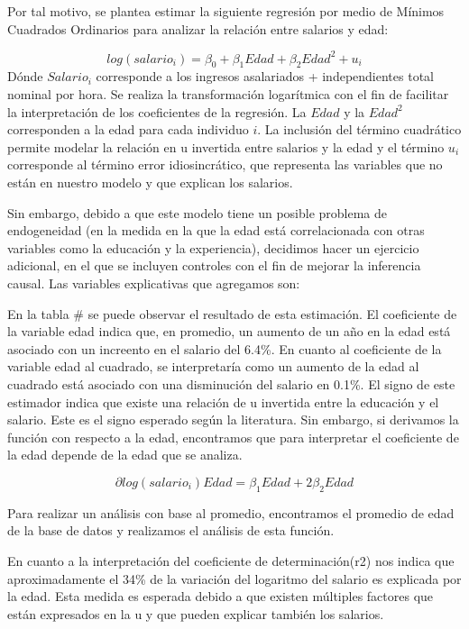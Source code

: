 \documentclass[
  11pt,
  letterpaper,
]{article}
\begin{document}
Por tal motivo, se plantea estimar la siguiente regresión por medio de
Mínimos Cuadrados Ordinarios para analizar la relación entre salarios y
edad:

\[
log(salario_i)=\beta_0{}+\beta_1 Edad +\beta_2  Edad^2 +u_i
\] Dónde \(Salario_i\) corresponde a los ingresos asalariados +
independientes total nominal por hora. Se realiza la transformación
logarítmica con el fin de facilitar la interpretación de los
coeficientes de la regresión. La \(Edad\) y la \(Edad^2\) corresponden a
la edad para cada individuo \(i\). La inclusión del término cuadrático
permite modelar la relación en u invertida entre salarios y la edad y el
término \(u_i\) corresponde al término error idiosincrático, que
representa las variables que no están en nuestro modelo y que explican
los salarios.

Sin embargo, debido a que este modelo tiene un posible problema de
endogeneidad (en la medida en la que la edad está correlacionada con
otras variables como la educación y la experiencia), decidimos hacer un
ejercicio adicional, en el que se incluyen controles con el fin de
mejorar la inferencia causal. Las variables explicativas que agregamos
son:

En la tabla \# se puede observar el resultado de esta estimación. El
coeficiente de la variable edad indica que, en promedio, un aumento de
un año en la edad está asociado con un increento en el salario del
6.4\%. En cuanto al coeficiente de la variable edad al cuadrado, se
interpretaría como un aumento de la edad al cuadrado está asociado con
una disminución del salario en 0.1\%. El signo de este estimador indica
que existe una relación de u invertida entre la educación y el salario.
Este es el signo esperado según la literatura. Sin embargo, si derivamos
la función con respecto a la edad, encontramos que para interpretar el
coeficiente de la edad depende de la edad que se analiza.

\[
\partial{log(salario_i)}{Edad}=\beta_1 Edad +2 \beta_2 Edad
\]

Para realizar un análisis con base al promedio, encontramos el promedio
de edad de la base de datos y realizamos el análisis de esta función.

En cuanto a la interpretación del coeficiente de determinación(r2) nos
indica que aproximadamente el 34\% de la variación del logaritmo del
salario es explicada por la edad. Esta medida es esperada debido a que
existen múltiples factores que están expresados en la u y que pueden
explicar también los salarios.
\end{document}
